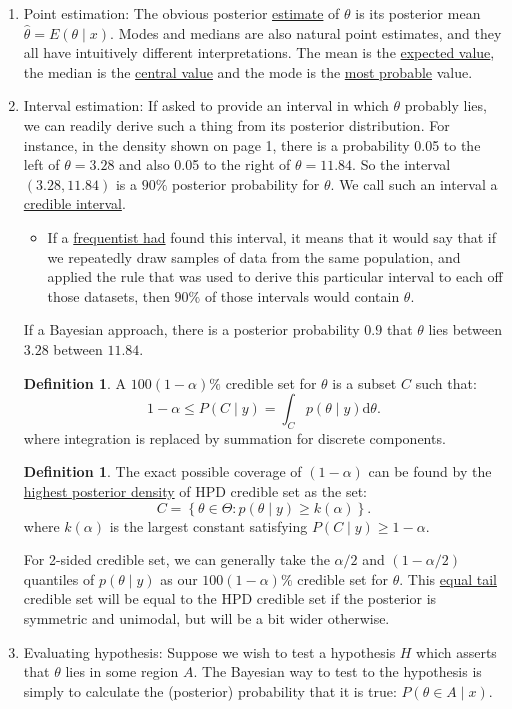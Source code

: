 \documentclass[lecture,12pt,]{pcms-l}
\numberwithin{section}{chapter}
\numberwithin{equation}{chapter}
\theoremstyle{plain}
\theoremstyle{definition}
\theoremstyle{definition}
\newtheorem{definition}[equation]{Definition}
\begin{document}
\begin{enumerate}
\item Point estimation: The obvious posterior \underline{estimate} of $\theta$ is its posterior mean $\hat{\theta}=E(\theta \mid x)$. Modes and medians are also natural point estimates, and they all have intuitively different interpretations. The mean is the \underline{expected value}, the median is the \underline{central value} and the mode is the \underline{most probable} value.
\item Interval estimation: If asked to provide an interval in which $\theta$ probably lies, we can readily derive such a thing from its posterior distribution. For instance, in the density shown on page 1, there is a probability 0.05 to the left of $\theta=3.28$ and also 0.05 to the right of $\theta = 11.84$. So the interval $(3.28,11.84)$ is a $90 \%$ posterior probability for $\theta$. We call such an interval a \underline{credible interval}.
\begin{itemize}
\item If a \underline{frequentist had} found this interval, it means that it would say that if we repeatedly draw samples of data from the same population, and applied the rule that was used to derive this particular interval to each off those datasets, then $90 \%$ of those intervals would contain $\theta$.
\end{itemize}
If a Bayesian approach, there is a posterior probability $0.9$ that $\theta$ lies between $3.28$ between $11.84$.
\begin{definition}
A $100(1-\alpha) \%$ credible set for $\theta$ is a subset $C$ such that:
\begin{equation}
1-\alpha \leq P(C \mid y)= \int_C p(\theta \mid y) \mathrm{d} \theta.
\end{equation}
where integration is replaced by summation for discrete components.
\end{definition}

\begin{definition}
The exact possible coverage of $(1-\alpha)$ can be found by the \underline{highest posterior density} of HPD credible set as the set: 
\begin{equation}
C= \left \{  \theta \in \Theta : p(\theta \mid y) \geq k(\alpha)\right \}.
\end{equation}
where $k(\alpha)$ is the largest constant satisfying $P(C \mid y) \geq 1-\alpha$. 
\end{definition}
For 2-sided credible set, we can generally take the $\alpha / 2$ and $(1- \alpha/2)$ quantiles of $p(\theta \mid y)$ as our $100(1-\alpha) \%$ credible set for $\theta$. This \underline{equal tail} credible set will be equal to the HPD credible set if the posterior is symmetric and unimodal, but will be a bit wider otherwise.

\item Evaluating hypothesis: Suppose we wish to test a hypothesis $H$ which asserts that $\theta$ lies in some region $A$. The Bayesian way to test to the hypothesis is simply to calculate the (posterior) probability that it is true: $P(\theta \in A \mid x)$. 
\end{enumerate}
\end{document}
